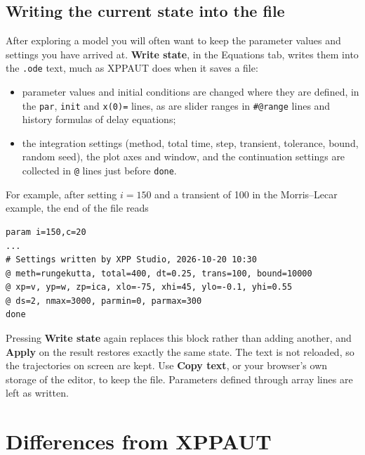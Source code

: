\documentclass[11pt,a4paper]{article}
\newcommand{\XPP}{\textsf{XPPAUT}}
\newcommand{\ui}[1]{\textsf{\textbf{#1}}}          %
\begin{document}
\subsection*{Writing the current state into the file}\label{sec:writestate}
After exploring a model you will often want to keep the parameter values and settings you have arrived at. \ui{Write state}, in the Equations tab, writes them into the \texttt{.ode} text, much as \XPP{} does when it saves a file:
\begin{itemize}
  \item parameter values and initial conditions are changed where they are defined, in the \texttt{par}, \texttt{init} and \texttt{x(0)=} lines, as are slider ranges in \texttt{\#@range} lines and history formulas of delay equations;
  \item the integration settings (method, total time, step, transient, tolerance, bound, random seed), the plot axes and window, and the continuation settings are collected in \texttt{@} lines just before \texttt{done}.
\end{itemize}
For example, after setting $i=150$ and a transient of 100 in the Morris--Lecar example, the end of the file reads
\begin{lstlisting}
param i=150,c=20
...
# Settings written by XPP Studio, 2026-10-20 10:30
@ meth=rungekutta, total=400, dt=0.25, trans=100, bound=10000
@ xp=v, yp=w, zp=ica, xlo=-75, xhi=45, ylo=-0.1, yhi=0.55
@ ds=2, nmax=3000, parmin=0, parmax=300
done
\end{lstlisting}
Pressing \ui{Write state} again replaces this block rather than adding another, and \ui{Apply} on the result restores exactly the same state. The text is not reloaded, so the trajectories on screen are kept. Use \ui{Copy text}, or your browser's own storage of the editor, to keep the file. Parameters defined through array lines are left as written.

\section{Differences from \XPP{}}
\end{document}
